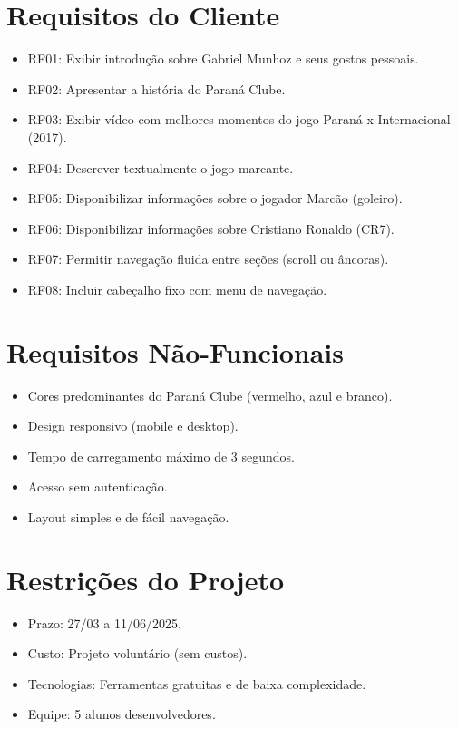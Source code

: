 \documentclass[12pt,a4paper]{article}
\begin{document}
\section{Requisitos do Cliente}
\begin{itemize}
    \item RF01: Exibir introdução sobre Gabriel Munhoz e seus gostos pessoais.
    \item RF02: Apresentar a história do Paraná Clube.
    \item RF03: Exibir vídeo com melhores momentos do jogo Paraná x Internacional (2017).
    \item RF04: Descrever textualmente o jogo marcante.
    \item RF05: Disponibilizar informações sobre o jogador Marcão (goleiro).
    \item RF06: Disponibilizar informações sobre Cristiano Ronaldo (CR7).
    \item RF07: Permitir navegação fluida entre seções (scroll ou âncoras).
    \item RF08: Incluir cabeçalho fixo com menu de navegação.
\end{itemize}

\section{Requisitos Não-Funcionais}
\begin{itemize}
    \item Cores predominantes do Paraná Clube (vermelho, azul e branco).
    \item Design responsivo (mobile e desktop).
    \item Tempo de carregamento máximo de 3 segundos.
    \item Acesso sem autenticação.
    \item Layout simples e de fácil navegação.
\end{itemize}

\section{Restrições do Projeto}
\begin{itemize}
    \item Prazo: 27/03 a 11/06/2025.
    \item Custo: Projeto voluntário (sem custos).
    \item Tecnologias: Ferramentas gratuitas e de baixa complexidade.
    \item Equipe: 5 alunos desenvolvedores.
\end{itemize}
\end{document}
